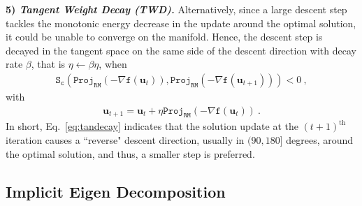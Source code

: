 \documentclass{article}
\newcommand{\mb}[1]{\mathbf{#1}}
\theoremstyle{plain}
\theoremstyle{definition}
\theoremstyle{remark}
\begin{document}
\textbf{5) \textit{Tangent Weight Decay (TWD).}}
Alternatively, since a large descent step tackles the monotonic energy decrease in the update around the optimal solution, it could be unable to converge on the manifold.
Hence, the descent step is decayed in the tangent space on the same side of the descent direction with decay rate $\beta$, that is $\eta \leftarrow \beta \eta$, when
%
\begin{equation}
\begin{aligned}
\label{eq:tandecay}
\texttt{S}_\texttt{c} \left( \texttt{Proj}_{\texttt{RM}} \left( -\nabla \texttt{f}(\mb{u}_t) \right), \texttt{Proj}_{\texttt{RM}} \left( -\nabla \texttt{f}(\mb{u}_{t+1}) \right) \right) < 0\ ,
\end{aligned}
\end{equation}
with
\begin{equation}
\begin{aligned}
\label{eq:tandecay_update}
\mb{u}_{t+1} = \mb{u}_{t} + \eta \texttt{Proj}_{\texttt{RM}} \left( -\nabla \texttt{f}(\mb{u}_t) \right)\ .
\end{aligned}
\end{equation}
In short, Eq.~\eqref{eq:tandecay} indicates that the solution update at the $(t+1)^{\text{th}}$ iteration causes a ``reverse" descent direction, usually in $(90, 180]$ degrees, around the optimal solution, and thus, a smaller step is preferred.

\subsection{Implicit Eigen Decomposition}
\end{document}
